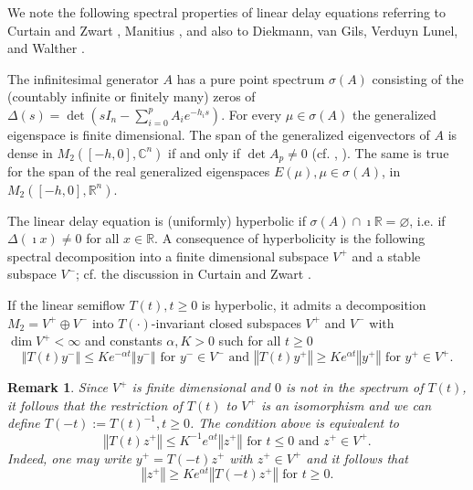 \documentclass{siamltex}%
\newtheorem{remark}[theorem]{Remark}
\begin{document}
We note the following spectral properties of linear delay equations referring
to Curtain and Zwart \cite{CurtZ}, Manitius \cite{Mani80}, and also to
Diekmann, van Gils, Verduyn Lunel, and Walther \cite[Chapter 5]{DivGVLW}.

The infinitesimal generator $A$ has a pure point spectrum $\sigma(A)$
consisting of the (countably infinite or finitely many) zeros of
$\Delta(s)=\det(sI_{n}-\sum_{i=0}^{p}A_{i}e^{-h_{i}s})$. For every $\mu
\in\sigma(A)$ the generalized eigenspace is finite dimensional. The span of
the generalized eigenvectors of $A$ is dense in $M_{2}([-h,0],\mathbb{C}^{n})$
if and only if $\det A_{p}\not =0$ (cf. \cite[Corollary 5.5]{Mani80},
\cite[Theorem 3.4.4]{CurtZ}). The same is true for the span of the real
generalized eigenspaces $E(\mu),\mu\in\sigma(A)$, in $M_{2}([-h,0],\mathbb{R}%
^{n})$.

The linear delay equation is (uniformly) hyperbolic if $\sigma(A)\cap
\imath\mathbb{R=\varnothing}$, i.e. if $\Delta(\imath x)\not =0$ for all
$x\in\mathbb{R}$. A consequence of hyperbolicity is the following spectral
decomposition into a finite dimensional subspace $V^{+}$ and a stable subspace
$V^{-}$; cf. the discussion in Curtain and Zwart \cite[Theorem 8.2.5]{CurtZ}.

\begin{theorem}
\label{Theorem_hyperbolic_delay}If the linear semiflow $T(t),t\geq0$ is
hyperbolic, it admits a decomposition $M_{2}=V^{+}\oplus V^{-}$ into
$T(\cdot)$-invariant closed subspaces $V^{+}$ and $V^{-}$ with $\dim
V^{+}<\infty$ and constants $\alpha,K>0$ such for all $t\geq0$%
\[
\left\Vert T(t)y^{-}\right\Vert \leq Ke^{-\alpha t}\left\Vert y^{-}\right\Vert
\text{ for }y^{-}\in V^{-}\text{ and }\left\Vert T(t)y^{+}\right\Vert \geq
Ke^{\alpha t}\left\Vert y^{+}\right\Vert \text{ for }y^{+}\in V^{+}.
\]

\end{theorem}

\begin{remark}
Since $V^{+}$ is finite dimensional and $0$ is not in the spectrum of $T(t)$,
it follows that the restriction of $T(t)$ to $V^{+}$ is an isomorphism and we
can define $T(-t):=T(t)^{-1},t\geq0$. The condition above is equivalent to%
\[
\left\Vert T(t)z^{+}\right\Vert \leq K^{-1}e^{\alpha t}\left\Vert
z^{+}\right\Vert \text{ for }t\leq0\text{ and }z^{+}\in V^{+}.
\]
Indeed, one may write $y^{+}=T(-t)z^{+}$ with $z^{+}\in V^{+}$ and it follows
that%
\[
\left\Vert z^{+}\right\Vert \geq Ke^{\alpha t}\left\Vert T(-t)z^{+}\right\Vert
\text{ for }t\geq0.
\]

\end{remark}
\end{document}
